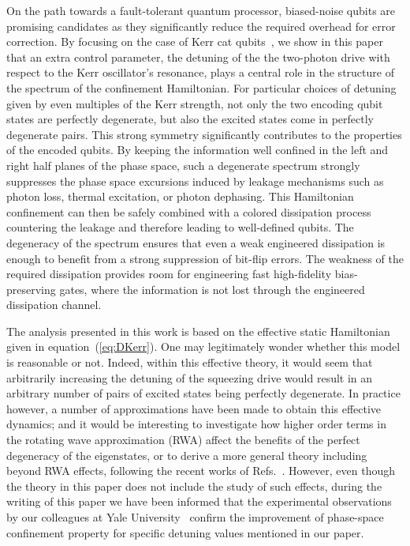 On the path towards a fault-tolerant quantum processor, biased-noise qubits are promising candidates as they significantly reduce the required overhead for error correction. By focusing on the case of Kerr cat qubits~\cite{Puri2017,Grimm2020,Frattini-2022}, we show in this paper that an extra control parameter, the detuning of the the two-photon drive with respect to the Kerr oscillator's resonance, plays a central role in the structure of the spectrum of the confinement Hamiltonian. For particular choices of detuning given by even multiples of the Kerr strength, not only the two encoding qubit states are perfectly degenerate, but also the excited states come in perfectly degenerate pairs. This strong symmetry significantly contributes to the properties of the encoded qubits. By keeping the information well confined in the left and right half planes of the phase space, such a degenerate spectrum strongly suppresses the phase space excursions induced by leakage mechanisms such as photon loss, thermal excitation, or photon dephasing. This Hamiltonian confinement can then be safely combined with a colored dissipation process countering the leakage and therefore leading to well-defined qubits. The degeneracy of the spectrum ensures that even a weak engineered dissipation is enough to benefit from a strong suppression of bit-flip errors. The weakness of the required dissipation provides room for engineering fast high-fidelity bias-preserving gates, where the information is not lost through the engineered dissipation channel. 

The analysis presented in this work is based on the effective static Hamiltonian given in equation~(\ref{eq:DKerr}). One may legitimately wonder whether this model is reasonable or not. Indeed, within this effective theory, it would seem that arbitrarily increasing the detuning of the squeezing drive would result in an arbitrary number of pairs of excited states being perfectly degenerate. In practice however, a number of approximations have been made to obtain this effective dynamics; and it would be interesting to investigate how higher order terms in the rotating wave approximation (RWA) affect the benefits of the perfect degeneracy of the eigenstates, or to derive a more general theory including beyond RWA effects, following the recent works of Refs.~\cite{Venkatraman2022}. However, even though the theory in this paper does not include the study of such effects, during the writing of this paper we have been informed that the experimental observations by our colleagues at Yale University~\cite{RodrigoExperiment} confirm the improvement of phase-space confinement property for specific detuning values mentioned in our paper.


